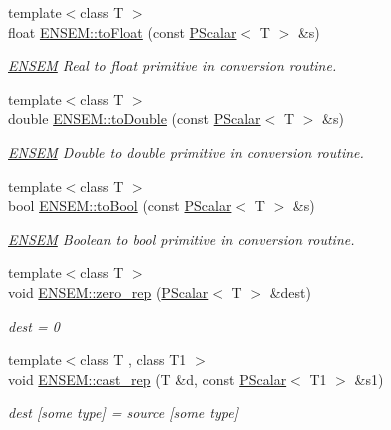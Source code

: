 \begin{DoxyCompactItemize}
{\footnotesize template$<$class T $>$ }\\float \mbox{\hyperlink{group__primscalar_gab273a0c0a29e18b106644d9def35d745}{E\+N\+S\+E\+M\+::to\+Float}} (const \mbox{\hyperlink{classENSEM_1_1PScalar}{P\+Scalar}}$<$ T $>$ \&s)
\begin{DoxyCompactList}\small\item\em \mbox{\hyperlink{namespaceENSEM}{E\+N\+S\+EM}} Real to float primitive in conversion routine. \end{DoxyCompactList}\item 
{\footnotesize template$<$class T $>$ }\\double \mbox{\hyperlink{group__primscalar_ga161f37d5fa3cda93eefdd3e606049805}{E\+N\+S\+E\+M\+::to\+Double}} (const \mbox{\hyperlink{classENSEM_1_1PScalar}{P\+Scalar}}$<$ T $>$ \&s)
\begin{DoxyCompactList}\small\item\em \mbox{\hyperlink{namespaceENSEM}{E\+N\+S\+EM}} Double to double primitive in conversion routine. \end{DoxyCompactList}\item 
{\footnotesize template$<$class T $>$ }\\bool \mbox{\hyperlink{group__primscalar_ga00261c3d6b58172e9dbb59a8d8518b4d}{E\+N\+S\+E\+M\+::to\+Bool}} (const \mbox{\hyperlink{classENSEM_1_1PScalar}{P\+Scalar}}$<$ T $>$ \&s)
\begin{DoxyCompactList}\small\item\em \mbox{\hyperlink{namespaceENSEM}{E\+N\+S\+EM}} Boolean to bool primitive in conversion routine. \end{DoxyCompactList}\item 
{\footnotesize template$<$class T $>$ }\\void \mbox{\hyperlink{group__primscalar_gaf5afd39d3948d69df06ad306b2fdb494}{E\+N\+S\+E\+M\+::zero\+\_\+rep}} (\mbox{\hyperlink{classENSEM_1_1PScalar}{P\+Scalar}}$<$ T $>$ \&dest)
\begin{DoxyCompactList}\small\item\em dest = 0 \end{DoxyCompactList}\item 
{\footnotesize template$<$class T , class T1 $>$ }\\void \mbox{\hyperlink{group__primscalar_ga32486e123809d21bcf028ab891ee845a}{E\+N\+S\+E\+M\+::cast\+\_\+rep}} (T \&d, const \mbox{\hyperlink{classENSEM_1_1PScalar}{P\+Scalar}}$<$ T1 $>$ \&s1)
\begin{DoxyCompactList}\small\item\em dest \mbox{[}some type\mbox{]} = source \mbox{[}some type\mbox{]} \end{DoxyCompactList}\item 

\end{DoxyCompactItemize}
